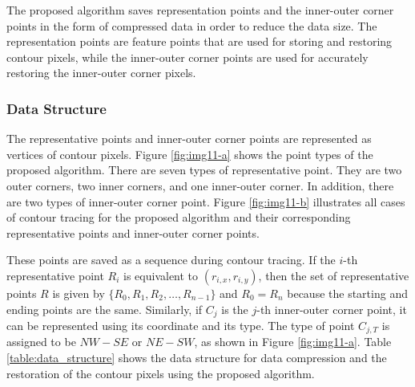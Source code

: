  The proposed algorithm saves representation points and the inner-outer corner points in the form of compressed data in order to reduce the data size. The representation points are feature points that are used for storing and restoring contour pixels, while the inner-outer corner points are used for accurately restoring the inner-outer corner pixels. 

 \subsubsection{Data Structure}

The representative points and inner-outer corner points are represented as vertices of contour pixels. Figure \ref{fig:img11-a} shows the point types of the proposed algorithm. There are seven types of representative point. They are two outer corners, two inner corners, and one inner-outer corner. In addition, there are two types of inner-outer corner point. Figure \ref{fig:img11-b} illustrates all cases of contour tracing for the proposed algorithm and their corresponding representative points and inner-outer corner points. 


 These points are saved as a sequence during contour tracing. If the $i$-th representative point $R_i$ is equivalent to $(r_{i,x}, r_{i,y})$, then the set of representative points $R$ is given by $\{R_0, R_1, R_2, … , R_{n-1}\}$ and $R_0 = R_n$ because the starting and ending points are the same. Similarly, if $C_j$ is the $j$-th inner-outer corner point, it can be represented using its coordinate and its type. The type of point $C_{j,T}$ is assigned to be $NW-SE$ or $NE-SW$, as shown in Figure \ref{fig:img11-a}. Table \ref{table:data_structure} shows the data structure for data compression and the restoration of the contour pixels using the proposed algorithm. 

